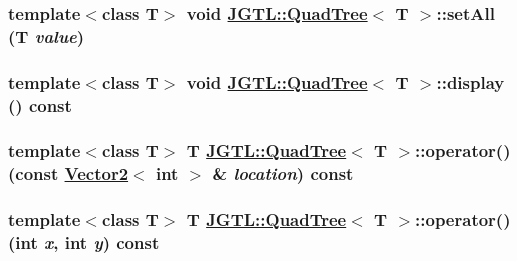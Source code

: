 \hypertarget{class_j_g_t_l_1_1_quad_tree_f2a38bf1f48a331b81050d3fd04f843c}{
\subsubsection[setAll]{\setlength{\rightskip}{0pt plus 5cm}template$<$class T$>$ void \hyperlink{class_j_g_t_l_1_1_quad_tree}{JGTL::Quad\-Tree}$<$ T $>$::set\-All (T {\em value})}}
\label{class_j_g_t_l_1_1_quad_tree_f2a38bf1f48a331b81050d3fd04f843c}


\hypertarget{class_j_g_t_l_1_1_quad_tree_ec3b9217d164d507156f6f39f440e712}{
\subsubsection[display]{\setlength{\rightskip}{0pt plus 5cm}template$<$class T$>$ void \hyperlink{class_j_g_t_l_1_1_quad_tree}{JGTL::Quad\-Tree}$<$ T $>$::display () const}}
\label{class_j_g_t_l_1_1_quad_tree_ec3b9217d164d507156f6f39f440e712}


\hypertarget{class_j_g_t_l_1_1_quad_tree_bf12879db39752804ea0350603bfb7e3}{
\subsubsection[operator()]{\setlength{\rightskip}{0pt plus 5cm}template$<$class T$>$ T \hyperlink{class_j_g_t_l_1_1_quad_tree}{JGTL::Quad\-Tree}$<$ T $>$::operator() (const \hyperlink{class_j_g_t_l_1_1_vector2}{Vector2}$<$ int $>$ \& {\em location}) const}}
\label{class_j_g_t_l_1_1_quad_tree_bf12879db39752804ea0350603bfb7e3}


\hypertarget{class_j_g_t_l_1_1_quad_tree_483b4a644c46b742bb7e77b32b6dc71b}{
\subsubsection[operator()]{\setlength{\rightskip}{0pt plus 5cm}template$<$class T$>$ T \hyperlink{class_j_g_t_l_1_1_quad_tree}{JGTL::Quad\-Tree}$<$ T $>$::operator() (int {\em x}, int {\em y}) const}}
\label{class_j_g_t_l_1_1_quad_tree_483b4a644c46b742bb7e77b32b6dc71b}




